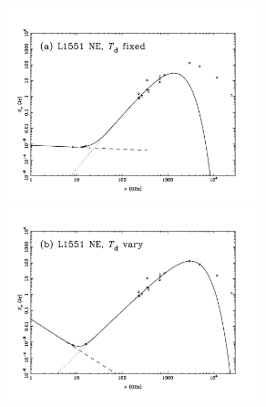 \documentclass[9pt]{extarticle}   	%
\begin{document}
\begin{figure}[htbp]
\begin{center}
\includegraphics[width=0.65\textwidth]{plots/L1551NE-TdFixed.pdf}\\
\includegraphics[width=0.65\textwidth]{plots/L1551NE.pdf}
\label{default}
\end{center}
\end{figure}

\clearpage
\end{document}
